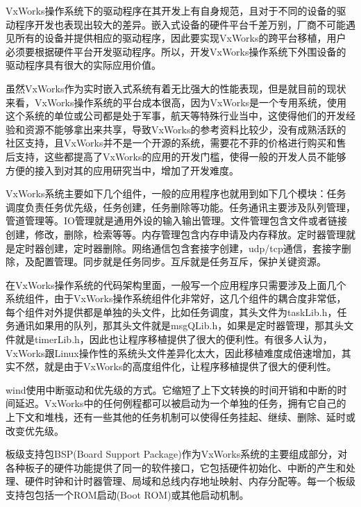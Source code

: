 {	VxWorks操作系统下的驱动程序在其开发上有自身规范，且对于不同的设备的驱动程序开发也表现出较大的差异。嵌入式设备的硬件平台千差万别，厂商不可能遇见所有的设备并提供相应的驱动程序，因此要实现VxWorks的跨平台移植，用户必须要根据硬件平台开发驱动程序。所以，开发VxWorks操作系统下外围设备的驱动程序具有很大的实际应用价值。
		
	虽然VxWorks作为实时嵌入式系统有着无比强大的性能表现，但是就目前的现状来看，VxWorks操作系统的平台成本很高，因为VxWorks是一个专用系统，使用这个系统的单位或公司都是处于军事，航天等特殊行业当中，这使得他们的开发经验和资源不能够拿出来共享，导致VxWorks的参考资料比较少，没有成熟活跃的社区支持，且VxWorks并不是一个开源的系统，需要花不菲的价格进行购买和售后支持，这些都提高了VxWorks的应用的开发门槛，使得一般的开发人员不能够方便的接入到对其的应用研究当中，增加了开发难度。
	
	





	VxWorks系统主要如下几个组件，一般的应用程序也就用到如下几个模块：任务调度负责任务优先级，任务创建，任务删除等功能。任务通讯主要涉及队列管理，管道管理等。IO管理就是通用外设的输入输出管理。文件管理包含文件或者链接创建，修改，删除，检索等等。内存管理包含内存申请及内存释放。定时器管理就是定时器创建，定时器删除。网络通信包含套接字创建，udp/tcp通信，套接字删除，及配置管理。同步就是任务同步。互斥就是任务互斥，保护关键资源。
	
	在VxWorks操作系统的代码架构里面，一般写一个应用程序只需要涉及上面几个系统组件，由于VxWorks操作系统组件化非常好，这几个组件的耦合度非常低，每个组件对外提供都是单独的头文件，比如任务调度，其头文件为taskLib.h，任务通讯如果用的队列，那其头文件就是msgQLib.h，如果是定时器管理，那其头文件就是timerLib.h，因此也让程序移植提供了很大的便利性。有很多人认为，VxWorks跟Linux操作性的系统头文件差异化太大，因此移植难度成倍速增加，其实不然，就是由于VxWorks的高度组件化，让程序移植提供了很大的便利性。
	
	
	wind使用中断驱动和优先级的方式。它缩短了上下文转换的时间开销和中断的时间延迟。VxWorks中的任何例程都可以被启动为一个单独的任务，拥有它自己的上下文和堆栈，还有一些其他的任务机制可以使得任务挂起、继续、删除、延时或改变优先级。	
	
	
	板级支持包BSP(Board Support Package)作为VxWorks系统的主要组成部分，对各种板子的硬件功能提供了同一的软件接口，它包括硬件初始化、中断的产生和处理、硬件时钟和计时器管理、局域和总线内存地址映射、内存分配等。每一个板级支持包包括一个ROM启动(Boot ROM)或其他启动机制。


}

